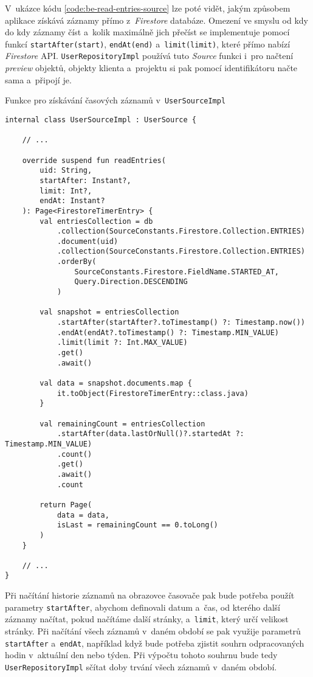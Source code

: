 V~ukázce kódu \ref{code:be-read-entries-source} lze poté vidět, jakým způsobem aplikace získává záznamy přímo z~\emph{Firestore} databáze. Omezení ve smyslu od kdy do kdy záznamy číst a~kolik maximálně jich přečíst se implementuje pomocí funkcí \texttt{startAfter(start)}, \texttt{endAt(end)} a~\texttt{limit(limit)}, které přímo nabízí \emph{Firestore} API. \texttt{UserRepositoryImpl} používá tuto \emph{Source} funkci i~pro načtení \emph{preview} objektů, objekty klienta a~projektu si pak pomocí identifikátoru načte sama a~připojí je.

\begin{listing}
\caption{Funkce pro získávání časových záznamů v~\texttt{UserSourceImpl}}\label{code:be-read-entries-source}
\begin{verbatim}
internal class UserSourceImpl : UserSource {

    // ...
    
    override suspend fun readEntries(
        uid: String,
        startAfter: Instant?,
        limit: Int?,
        endAt: Instant?
    ): Page<FirestoreTimerEntry> {
        val entriesCollection = db
            .collection(SourceConstants.Firestore.Collection.ENTRIES)
            .document(uid)
            .collection(SourceConstants.Firestore.Collection.ENTRIES)
            .orderBy(
                SourceConstants.Firestore.FieldName.STARTED_AT, 
                Query.Direction.DESCENDING
            )

        val snapshot = entriesCollection
            .startAfter(startAfter?.toTimestamp() ?: Timestamp.now())
            .endAt(endAt?.toTimestamp() ?: Timestamp.MIN_VALUE)
            .limit(limit ?: Int.MAX_VALUE)
            .get()
            .await()

        val data = snapshot.documents.map { 
            it.toObject(FirestoreTimerEntry::class.java) 
        }

        val remainingCount = entriesCollection
            .startAfter(data.lastOrNull()?.startedAt ?: Timestamp.MIN_VALUE)
            .count()
            .get()
            .await()
            .count

        return Page(
            data = data,
            isLast = remainingCount == 0.toLong()
        )
    }
    
    // ...
}
\end{verbatim}
\end{listing}

Při načítání historie záznamů na obrazovce časovače pak bude potřeba použít parametry \texttt{startAfter}, abychom definovali datum a~čas, od kterého další záznamy načítat, pokud načítáme další stránky, a~\texttt{limit}, který určí velikost stránky. Při načítání všech záznamů v~daném období se pak využije parametrů \texttt{startAfter} a~\texttt{endAt}, například když bude potřeba zjistit souhrn odpracovaných hodin v~aktuální den nebo týden. Při výpočtu tohoto souhrnu bude tedy \texttt{UserRepositoryImpl} sčítat doby trvání všech záznamů v~daném období.

